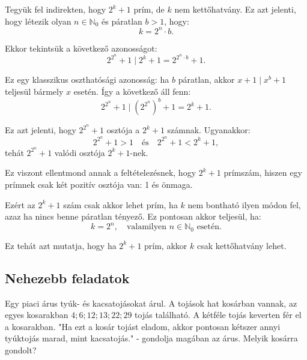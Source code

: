 \begin{solution}
Tegyük fel indirekten, hogy $2^{k}+1$ prím, de $k$ nem kettőhatvány.
Ez azt jelenti, hogy létezik olyan $n\in\mathbb{N}_{0}$ és páratlan
$b>1$, hogy: 
\[
k=2^{n}\cdot b.
\]

Ekkor tekintsük a következő azonosságot: 
\[
2^{2^{n}}+1\mid2^{k}+1=2^{2^{n}\cdot b}+1.
\]

Ez egy klasszikus oszthatósági azonosság: ha $b$ páratlan, akkor
$x+1\mid x^{b}+1$ teljesül bármely $x$ esetén. Így a következő áll
fenn: 
\[
2^{2^{n}}+1\mid(2^{2^{n}})^{b}+1=2^{k}+1.
\]

Ez azt jelenti, hogy $2^{2^{n}}+1$ osztója a $2^{k}+1$ számnak.
Ugyanakkor: 
\[
2^{2^{n}}+1>1\quad\text{és}\quad2^{2^{n}}+1<2^{k}+1,
\]
tehát $2^{2^{n}}+1$ valódi osztója $2^{k}+1$-nek.

Ez viszont ellentmond annak a feltételezésnek, hogy $2^{k}+1$ prímszám,
hiszen egy prímnek csak két pozitív osztója van: 1 és önmaga.

\medskip{}

Ezért az $2^{k}+1$ szám csak akkor lehet prím, ha $k$ nem bontható
ilyen módon fel, azaz ha nincs benne páratlan tényező. Ez pontosan
akkor teljesül, ha: 
\[
k=2^{n},\quad\text{valamilyen }n\in\mathbb{N}_{0}\text{ esetén}.
\]

\medskip{}

Ez tehát azt mutatja, hogy ha $2^{k}+1$ prím, akkor $k$ csak kettőhatvány
lehet.
\end{solution}

\subsection*{Nehezebb feladatok}
\begin{extraproblem}
Egy piaci árus tyúk- és kacsatojásokat árul. A tojások hat kosárban
vannak, az egyes kosarakban $4;6;12;13;22;29$ tojás található. A
kétféle tojás keverten fér el a kosarakban. "Ha ezt a kosár tojást
eladom, akkor pontosan kétszer annyi tyúktojás marad, mint kacsatojás."
- gondolja magában az árus. Melyik kosárra gondolt? 
\end{extraproblem}

